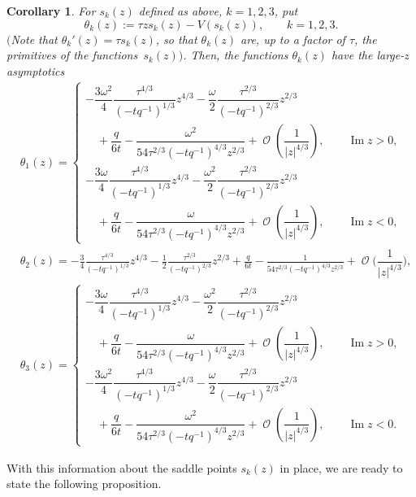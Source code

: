 \documentclass[pdftex]{sigma}
\DeclareMathOperator{\OO}{\mathcal{O}}
\numberwithin{equation}{section}
\newtheorem{Corollary}[Theorem]{Corollary}
\begin{document}
 \begin{Corollary}
 For $s_k(z)$ defined as above, $k=1,2,3$, put
 \begin{equation*}
 \theta_k(z) := \tau z s_k(z) - V(s_k(z)),\qquad k=1,2,3.
 \end{equation*}
 $($Note that $\theta_k'(z) = \tau s_k(z)$, so that $\theta_k(z)$ are, up to a factor of $\tau$, the primitives of the functions~$s_k(z))$. Then, the functions $\theta_k(z)$ have the large-$z$ asymptotics
 \begin{align}\label{theta-z-asymp}
 &\theta_1(z) =
 \begin{cases}
 -\dfrac{3\omega^2}{4} \dfrac{\tau^{4/3}}{(-tq^{-1})^{1/3}}z^{4/3} - \dfrac{\omega}{2}\dfrac{\tau^{2/3}}{(-tq^{-1})^{2/3}}z^{2/3} \\
 \quad {}+ \dfrac{q}{6t}- \dfrac{\omega^2}{54\tau^{2/3}(-tq^{-1})^{4/3}z^{2/3}} + \OO\left(\dfrac{1}{|z|^{4/3}}\right), \qquad \operatorname{Im} z>0,\\[1.5mm]
 -\dfrac{3\omega}{4} \dfrac{\tau^{4/3}}{(-tq^{-1})^{1/3}}z^{4/3} - \dfrac{\omega^{2}}{2}\dfrac{\tau^{2/3}}{(-tq^{-1})^{2/3}}z^{2/3} \\
 \quad{}+ \dfrac{q}{6t}- \dfrac{\omega}{54\tau^{2/3}(-tq^{-1})^{4/3}z^{2/3}} + \OO\left(\dfrac{1}{|z|^{4/3}}\right), \qquad \operatorname{Im} z<0,
 \end{cases}\\
 &\theta_2(z) = -\frac{3}{4} \frac{\tau^{4/3}}{(-tq^{-1})^{1/3}}z^{4/3} - \frac{1}{2}\frac{\tau^{2/3}}{(-tq^{-1})^{2/3}}z^{2/3} + \frac{q}{6t} - \frac{1}{54\tau^{2/3}(-tq^{-1})^{4/3}z^{2/3}} + \OO\biggl(\!\dfrac{1}{|z|^{4/3}}\!\biggr),\nonumber\\
 &\theta_3(z) =
 \begin{cases}
 -\dfrac{3\omega}{4} \dfrac{\tau^{4/3}}{(-tq^{-1})^{1/3}}z^{4/3} - \dfrac{\omega^{2}}{2}\dfrac{\tau^{2/3}}{(-tq^{-1})^{2/3}}z^{2/3} \\
 \quad{}+ \dfrac{q}{6t}- \dfrac{\omega}{54\tau^{2/3}(-tq^{-1})^{4/3}z^{2/3}} + \OO\left(\dfrac{1}{|z|^{4/3}}\right), \qquad \operatorname{Im} z>0,\\[1.5mm]
 -\dfrac{3\omega^2}{4} \dfrac{\tau^{4/3}}{(-tq^{-1})^{1/3}}z^{4/3} - \dfrac{\omega}{2}\dfrac{\tau^{2/3}}{(-tq^{-1})^{2/3}}z^{2/3} \\
 \quad{} + \dfrac{q}{6t}- \dfrac{\omega^2}{54\tau^{2/3}(-tq^{-1})^{4/3}z^{2/3}} + \OO\left(\dfrac{1}{|z|^{4/3}}\right), \qquad \operatorname{Im} z<0.\nonumber
 \end{cases}
 \end{align}
 \end{Corollary}
With this information about the saddle points $s_k(z)$ in place, we are ready to state the following proposition.
\end{document}
